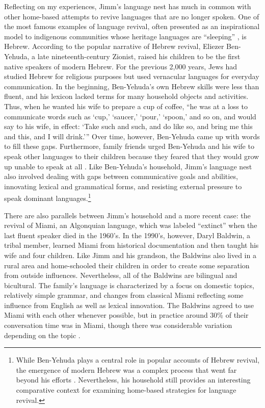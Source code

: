 \documentclass[output=paper]{LSP/langsci}
\begin{document}
Reflecting on my experiences, Jimm's language nest has much in common with other home-based attempts to revive languages that are no longer spoken. One of the most famous examples of language revival, often presented as an inspirational model to indigenous communities whose heritage languages are ``sleeping'' \citep[see][]{Hinton2008}, is Hebrew. According to the popular narrative of Hebrew revival, Eliezer Ben-Yehuda, a late nineteenth-century Zionist, raised his children to be the first native speakers of modern Hebrew. For the previous 2,000 years, Jews had studied Hebrew for religious purposes but used vernacular languages for everyday communication. In the beginning, Ben-Yehuda's own Hebrew skills were less than fluent, and his lexicon lacked terms for many household objects and activities. Thus, when he wanted his wife to prepare a cup of coffee, ``he was at a loss to communicate words such as `cup,' `saucer,' `pour,' `spoon,' and so on, and would say to his wife, in effect: `Take such and such, and do like so, and bring me this and this, and I will drink.'\thinspace'' \citep[37--38]{Fellman1973} Over time, however, Ben-Yehuda came up with words to fill these gaps. Furthermore, family friends urged Ben-Yehuda and his wife to speak other languages to their children because they feared that they would grow up unable to speak at all \citep[50--53]{BenAvi1984}. Like Ben-Yehuda's household, Jimm's language nest also involved dealing with gaps between communicative goals and abilities, innovating lexical and grammatical forms, and resisting external pressure to speak dominant languages.\footnote{While Ben-Yehuda plays a central role in popular accounts of Hebrew revival, the emergence of modern Hebrew was a complex process that went far beyond his efforts \citep{Harshav1999}. Nevertheless, his household still provides an interesting comparative context for examining home-based strategies for language revival.}

There are also parallels between Jimm's household and a more recent case: the revival of Miami, an Algonquian language, which was labeled ``extinct'' when the last fluent speaker died in the 1960's. In the 1990's, however, Daryl Baldwin, a tribal member, learned Miami from historical documentation and then taught his wife and four children. Like Jimm and his grandson, the Baldwins also lived in a rural area and home-schooled their children in order to create some separation from outside influences. Nevertheless, all of the Baldwins are bilingual and bicultural. The family's language is characterized by a focus on domestic topics, relatively simple grammar, and changes from classical Miami reflecting some influence from English as well as lexical innovation. The Baldwins agreed to use Miami with each other whenever possible, but in practice around 30\% of their conversation time was in Miami, though there was considerable variation depending on the topic \citep[14]{Leonard2007}.
\end{document}
